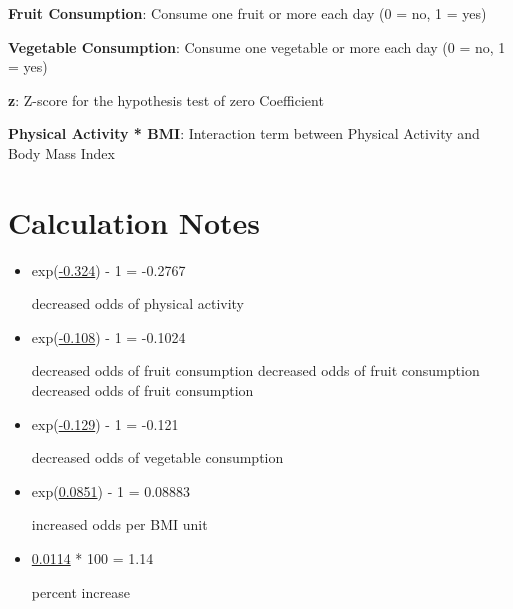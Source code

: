 \documentclass[11pt]{article}
\begin{document}
\begin{codeoutput}
\begin{table}[h]
\begin{threeparttable}
\begin{tablenotes}
\item \textbf{Fruit Consumption}: Consume one fruit or more each day (0 = no, 1 = yes)
\item \textbf{Vegetable Consumption}: Consume one vegetable or more each day (0 = no, 1 = yes)
\item \textbf{z}: Z-score for the hypothesis test of zero Coefficient
\item \textbf{Physical Activity * BMI}: Interaction term between Physical Activity and Body Mass Index
\end{tablenotes}
\end{threeparttable}
\end{table}

\end{codeoutput}

\section{Calculation Notes}
\begin{itemize}
\item{exp(\hyperlink{A2a}{-0.324}) - 1 = -0.2767

decreased odds of physical activity}
\item{exp(\hyperlink{A3a}{-0.108}) - 1 = -0.1024

decreased odds of fruit consumption decreased odds of fruit consumption decreased odds of fruit consumption}
\item{exp(\hyperlink{A4a}{-0.129}) - 1 = -0.121

decreased odds of vegetable consumption}
\item{exp(\hyperlink{A5a}{0.0851}) - 1 = 0.08883

increased odds per BMI unit}
\item{\hyperlink{B4a}{0.0114} * 100 = 1.14

percent increase}
\end{itemize}
\end{document}
